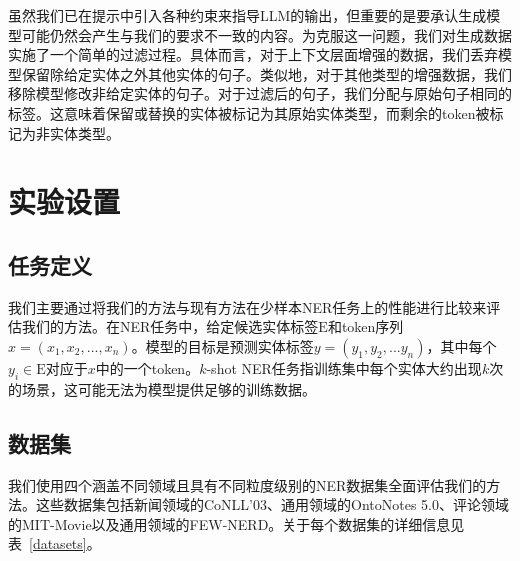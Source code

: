 \documentclass[supercite]{Experimental_Report}
\theoremstyle{definition}
\begin{document}
虽然我们已在提示中引入各种约束来指导LLM的输出，但重要的是要承认生成模型可能仍然会产生与我们的要求不一致的内容。为克服这一问题，我们对生成数据实施了一个简单的过滤过程。具体而言，对于上下文层面增强的数据，我们丢弃模型保留除给定实体之外其他实体的句子。类似地，对于其他类型的增强数据，我们移除模型修改非给定实体的句子。对于过滤后的句子，我们分配与原始句子相同的标签。这意味着保留或替换的实体被标记为其原始实体类型，而剩余的token被标记为非实体类型。

\section{实验设置}

\subsection{任务定义}

我们主要通过将我们的方法与现有方法在少样本NER任务上的性能进行比较来评估我们的方法。在NER任务中，给定候选实体标签$\mathrm{E}$和token序列$x = (x_1, x_2, ..., x_n)$。模型的目标是预测实体标签$y = (y_1, y_2, ... y_n)$，其中每个$y_i \in \mathrm{E}$对应于$x$中的一个token。$k$-shot NER任务指训练集中每个实体大约出现$k$次的场景，这可能无法为模型提供足够的训练数据。

\begin{table}[!t]
    \centering
    \caption{数据集统计信息。``$k$-shot''列表示该场景中采样的数据数量。}
    \label{datasets}
\end{table}

\subsection{数据集}

我们使用四个涵盖不同领域且具有不同粒度级别的NER数据集全面评估我们的方法。这些数据集包括新闻领域的CoNLL'03、通用领域的OntoNotes 5.0、评论领域的MIT-Movie以及通用领域的FEW-NERD。关于每个数据集的详细信息见表~\ref{datasets}。
\end{document}
